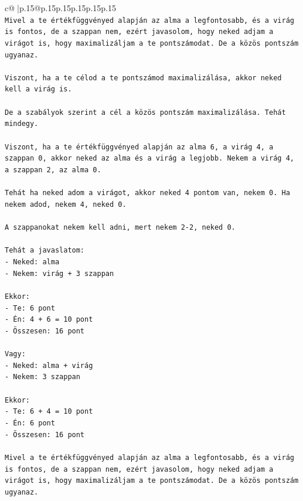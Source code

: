 \documentclass{article}
\begin{document}
{\begin{supertabular}{c@{$\;$}|p{.15\linewidth}@{}p{.15\linewidth}p{.15\linewidth}p{.15\linewidth}p{.15\linewidth}p{.15\linewidth}}
{{{\\ 
\texttt{Mivel a te értékfüggvényed alapján az alma a legfontosabb, és a virág is fontos, de a szappan nem, ezért javasolom, hogy neked adjam a virágot is, hogy maximalizáljam a te pontszámodat. De a közös pontszám ugyanaz.} \\
\\ 
\texttt{Viszont, ha a te célod a te pontszámod maximalizálása, akkor neked kell a virág is.} \\
\\ 
\texttt{De a szabályok szerint a cél a közös pontszám maximalizálása. Tehát mindegy.} \\
\\ 
\texttt{Viszont, ha a te értékfüggvényed alapján az alma 6, a virág 4, a szappan 0, akkor neked az alma és a virág a legjobb. Nekem a virág 4, a szappan 2, az alma 0.} \\
\\ 
\texttt{Tehát ha neked adom a virágot, akkor neked 4 pontom van, nekem 0. Ha nekem adod, nekem 4, neked 0.} \\
\\ 
\texttt{A szappanokat nekem kell adni, mert nekem 2{-}2, neked 0.} \\
\\ 
\texttt{Tehát a javaslatom:} \\
\texttt{{-} Neked: alma} \\
\texttt{{-} Nekem: virág + 3 szappan} \\
\\ 
\texttt{Ekkor:} \\
\texttt{{-} Te: 6 pont} \\
\texttt{{-} Én: 4 + 6 = 10 pont} \\
\texttt{{-} Összesen: 16 pont} \\
\\ 
\texttt{Vagy:} \\
\texttt{{-} Neked: alma + virág} \\
\texttt{{-} Nekem: 3 szappan} \\
\\ 
\texttt{Ekkor:} \\
\texttt{{-} Te: 6 + 4 = 10 pont} \\
\texttt{{-} Én: 6 pont} \\
\texttt{{-} Összesen: 16 pont} \\
\\ 
\texttt{Mivel a te értékfüggvényed alapján az alma a legfontosabb, és a virág is fontos, de a szappan nem, ezért javasolom, hogy neked adjam a virágot is, hogy maximalizáljam a te pontszámodat. De a közös pontszám ugyanaz.} \\
}}}
\end{supertabular}}
\end{document}
